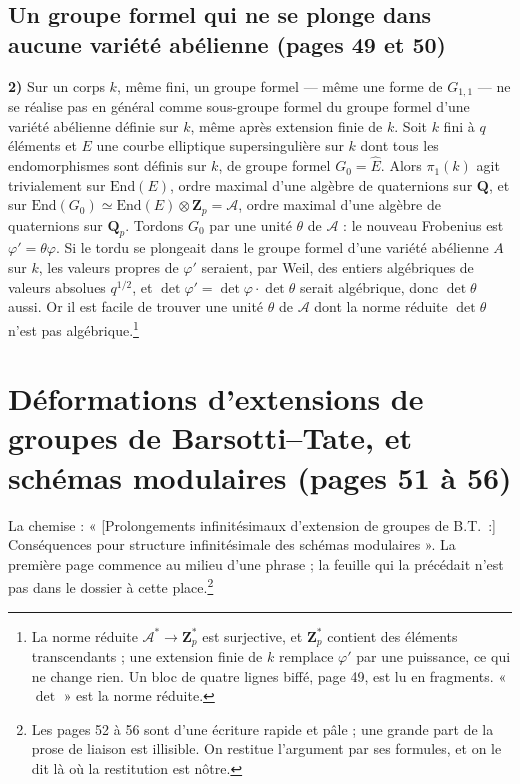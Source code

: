 \documentclass[11pt,a4paper]{article}
\begin{document}
\subsection*{Un groupe formel qui ne se plonge dans aucune variété abélienne (pages 49 et 50)}

\textbf{2)} Sur un corps $k$, même fini, un groupe formel — même une forme de
$G_{1,1}$ — ne se réalise pas en général comme sous-groupe formel du groupe
formel d'une variété abélienne définie sur $k$, même après extension finie de
$k$. Soit $k$ fini à $q$ éléments et $E$ une courbe elliptique supersingulière
sur $k$ dont tous les endomorphismes sont définis sur $k$, de groupe formel
$G_0 = \widehat{E}$. Alors $\pi_1(k)$ agit trivialement sur $\mathrm{End}(E)$,
ordre maximal d'une algèbre de quaternions sur $\mathbf{Q}$, et sur
$\mathrm{End}(G_0) \simeq \mathrm{End}(E) \otimes \mathbf{Z}_p = \mathcal{A}$,
ordre maximal d'une algèbre de quaternions sur $\mathbf{Q}_p$. Tordons $G_0$
par une unité $\theta$ de $\mathcal{A}$ : le nouveau Frobenius est
$\varphi' = \theta\varphi$. Si le tordu se plongeait dans le groupe formel
d'une variété abélienne $A$ sur $k$, les valeurs propres de $\varphi'$ seraient,
par Weil, des entiers algébriques de valeurs absolues $q^{1/2}$, et
$\det\varphi' = \det\varphi \cdot \det\theta$ serait algébrique, donc
$\det\theta$ aussi. Or il est facile de trouver une unité $\theta$ de
$\mathcal{A}$ dont la norme réduite $\det\theta$ n'est pas algébrique.\footnote{La
norme réduite $\mathcal{A}^* \to \mathbf{Z}_p^*$ est surjective, et
$\mathbf{Z}_p^*$ contient des éléments transcendants ; une extension finie de
$k$ remplace $\varphi'$ par une puissance, ce qui ne change rien. Un bloc de
quatre lignes biffé, page 49, est lu en fragments. « $\det$ » est la norme
réduite.}

\section*{Déformations d'extensions de groupes de Barsotti--Tate, et schémas modulaires (pages 51 à 56)}

La chemise : « [Prolongements infinitésimaux d'extension de groupes de B.T.\ :]
Conséquences pour structure infinitésimale des schémas modulaires ». La première
page commence au milieu d'une phrase ; la feuille qui la précédait n'est pas
dans le dossier à cette place.\footnote{Les pages 52 à 56 sont d'une écriture
rapide et pâle ; une grande part de la prose de liaison est illisible. On
restitue l'argument par ses formules, et on le dit là où la restitution est
nôtre.}
\end{document}
